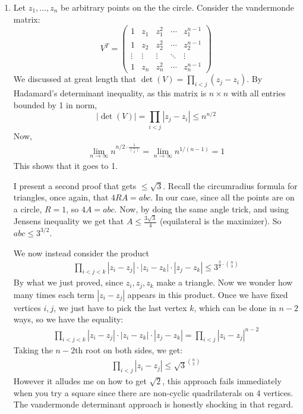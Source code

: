 \documentclass[12pt]{article}
\theoremstyle{definitionstyle}
\newcommand{\1}{\mathds 1}
\begin{document}
\begin{enumerate}
        \item Let $z_1, \ldots, z_n$ be arbitrary points on the the circle. Consider the vandermonde matrix:
        \[
            V^T = \begin{pmatrix}
            1 & z_1 & z_1^2 & \cdots & z_1^{n-1} \\
            1 & z_2 & z_2^2 & \cdots & z_2^{n-1} \\
            \vdots & \vdots & \vdots & \ddots & \vdots \\
            1 & z_n & z_n^2 & \cdots & z_n^{n-1}
            \end{pmatrix}
        \]
        We discussed at great length that $\det(V) = \prod_{i < j} (z_j-z_i)$. By Hadamard's determinant inequality, as this matrix is $n \times n$ with all entries bounded by 1 in norm,
        \[
            |\det(V)| = \prod_{i < j} |z_j-z_i| \leq n^{n/2}
        \]
        Now,
        \begin{align*}
            \lim_{n \to \infty} n^{n/2 \cdot \frac{1}{{n \choose 2}}} = \lim_{n \to \infty} n^{1/(n-1)} = 1
        \end{align*}
        This shows that it goes to 1. 

        I present a second proof that gets $\leq \sqrt{3}$. Recall the circumradius formula for triangles, once again, that $4RA = abc$. In our case, since all the points are on a circle, $R = 1$, so $4A = abc$. Now, by doing the same angle trick, and using Jensens inequality we get that $A \leq \frac{3\sqrt{3}}{4}$ (equilateral is the maximizer). So $abc \leq 3^{3/2}$. 

        We now instead consider the product
        \begin{align*}
            \prod_{i < j < k} |z_i-z_j| \cdot |z_i - z_k| \cdot |z_j - z_k| \leq 3^{\frac 32 \cdot {n \choose 3}}
        \end{align*}
        By what we just proved, since $z_i,z_j,z_k$ make a triangle. Now we wonder how many times each term $|z_i - z_j|$ appears in this product. Once we have fixed vertices $i,j$, we just have to pick the last vertex $k$, which can be done in $n-2$ ways, so we have the equality:
        \begin{align*}
            \prod_{i < j < k} |z_i-z_j| \cdot |z_i - z_k| \cdot |z_j - z_k| = \prod_{i < j} |z_i - z_j|^{n-2}
        \end{align*}
        Taking the $n-2$th root on both sides, we get:
        \begin{align*}
            \prod_{i < j} |z_i - z_j| \leq \sqrt{3}^{{n \choose 2}}
        \end{align*}
        However it alludes me on how to get $\sqrt{2}$, this approach fails immediately when you try a square since there are non-cyclic quadrilaterals on 4 vertices. The vandermonde determinant approach is honestly shocking in that regard.
    \end{enumerate}
\end{document}
